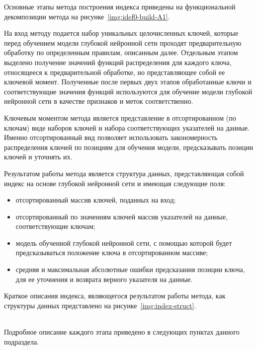 Основные этапы метода построения индекса приведены на функциональной
декомпозиции метода на рисунке~\ref{img:idef0-build-A1}. 


На вход методу подается набор уникальных целочисленных ключей, которые перед
обучением модели глубокой нейронной сети проходят предварительную обработку по
определенным правилам, описанным далее. Отдельным этапом выделено получение
значений функций распределения для каждого ключа, относящееся к предварительной
обработке, но представляющее собой ее ключевой момент. Полученные после первых
двух этапов обработанные ключи и соответствующие значения функций используются
для обучение модели глубокой нейронной сети в качестве признаков и меток
соответственно.

Ключевым моментом метода является представление в отсортированном (по ключам)
виде наборов ключей и набора соответствующих указателей на данные. Именно
отсортированный вид позволяет использовать закономерность распределения ключей
по позициям для обучения модели, предсказывать позиции ключей и уточнять их.

Результатом работы метода является структура данных, представляющая собой индекс
на основе глубокой нейронной сети и имеющая следующие поля:

\begin{itemize}
    \item отсортированный массив ключей, поданных на вход;
    \item отсортированный по значениям ключей массив указателей
        на данные, соответствующие ключам;
    \item модель обученной глубокой нейронной сети, с помощью которой будет
        предсказываться положение ключа в отсортированном массиве;
    \item средняя и максимальная абсолютные ошибки предсказания позиции ключа,
        для ее уточнения и возврата верного указателя на данные.
\end{itemize}

Краткое описания индекса, являющегося результатом работы метода, как структуры
данных представлено на рисунке~\ref{img:index-struct}.


~\\
Подробное описание каждого этапа приведено в следующих пунктах данного
подраздела.

